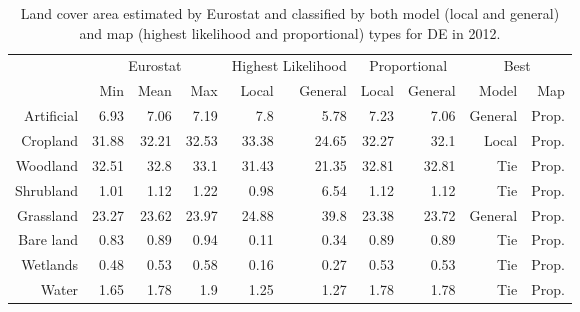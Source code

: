     \begin{table}[H]
    \centering
    \caption{Land cover area estimated by Eurostat and classified by both model (local and general) and map (highest likelihood and proportional) types for DE in 2012.}
    
    \begin{tabular}{r|rrr|rr|rr|rr}
    \toprule
    {} & \multicolumn{3}{|c}{Eurostat} & \multicolumn{2}{|c}{Highest Likelihood} & \multicolumn{2}{|c}{Proportional} & \multicolumn{2}{|c}{Best} \\
    {} &      Min &   Mean &    Max &              Local & General &        Local & General &    Model &    Map \\
    \midrule
    Artificial &     6.93 &   7.06 &   7.19 &                7.8 &    5.78 &         7.23 &    7.06 &  General &  Prop. \\
    Cropland   &    31.88 &  32.21 &  32.53 &              33.38 &   24.65 &        32.27 &    32.1 &    Local &  Prop. \\
    Woodland   &    32.51 &   32.8 &   33.1 &              31.43 &   21.35 &        32.81 &   32.81 &      Tie &  Prop. \\
    Shrubland  &     1.01 &   1.12 &   1.22 &               0.98 &    6.54 &         1.12 &    1.12 &      Tie &  Prop. \\
    Grassland  &    23.27 &  23.62 &  23.97 &              24.88 &    39.8 &        23.38 &   23.72 &  General &  Prop. \\
    Bare land  &     0.83 &   0.89 &   0.94 &               0.11 &    0.34 &         0.89 &    0.89 &      Tie &  Prop. \\
    Wetlands   &     0.48 &   0.53 &   0.58 &               0.16 &    0.27 &         0.53 &    0.53 &      Tie &  Prop. \\
    Water      &     1.65 &   1.78 &    1.9 &               1.25 &    1.27 &         1.78 &    1.78 &      Tie &  Prop. \\
    \bottomrule
    \end{tabular}
    \end{table}
    
